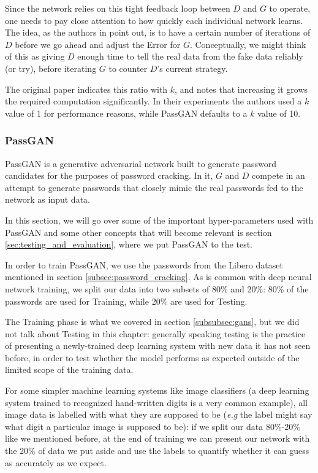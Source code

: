 Since the network relies on this tight feedback loop between $D$ and $G$ to operate, one needs to pay close attention to how quickly each individual network learns.
The idea, as the authors in \cite{Goodfellow2014} point out, is to have a certain number of iterations of $D$ before we go ahead and adjust the Error for $G$. Conceptually, we might think of this as giving $D$ enough time to tell the real data from the fake data reliably (or try), before iterating $G$ to counter $D$'s current strategy.

The original paper indicates this ratio with $k$, and notes that increasing it grows the required computation significantly. In their experiments the authors used a $k$ value of 1 for performance reasons, while PassGAN defaults to a $k$ value of 10\cite{PassGAN}.

\subsubsection{PassGAN}\label{subsubsec:gans-passgan}
PassGAN is a generative adversarial network built to generate password candidates for the purposes of password cracking. In it, $G$ and $D$ compete in an attempt to generate passwords that closely mimic the real passwords fed to the network as input data.

In this section, we will go over some of the important hyper-parameters used with PassGAN and some other concepts that will become relevant is section \ref{sec:testing_and_evaluation}, where we put PassGAN to the test.

In order to train PassGAN, we use the passwords from the Libero dataset mentioned in section \ref{subsec:password_cracking}. As is common with deep neural network training, we split our data into two subsets of 80\% and 20\%: 80\% of the passwords are used for Training, while 20\% are used for Testing. 

 The Training phase is what we covered in section \ref{subsubsec:gans}, but we did not talk about Testing in this chapter: generally speaking testing is the practice of presenting a newly-trained deep learning system with new data it has not seen before, in order to test whether the model performs as expected outside of the limited scope of the training data.

For some simpler machine learning systems like image classifiers (a deep learning system trained to recognized hand-written digits is a very common example), all image data is labelled with what they are supposed to be (\emph{e.g} the label might say what digit a particular image is supposed to be): if we split our data 80\%-20\% like we mentioned before, at the end of training we can present our network with the 20\% of data we put aside and use the labels to quantify whether it can guess as accurately as we expect. 

